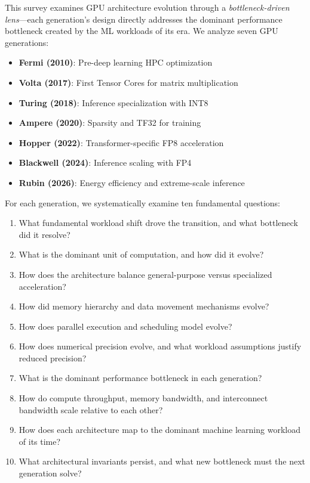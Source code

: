 \documentclass{article}
\begin{document}
This survey examines GPU architecture evolution through a \textit{bottleneck-driven lens}—each generation's design directly addresses the dominant performance bottleneck created by the ML workloads of its era. We analyze seven GPU generations:

\begin{itemize}
\item \textbf{Fermi (2010)}: Pre-deep learning HPC optimization
\item \textbf{Volta (2017)}: First Tensor Cores for matrix multiplication
\item \textbf{Turing (2018)}: Inference specialization with INT8
\item \textbf{Ampere (2020)}: Sparsity and TF32 for training
\item \textbf{Hopper (2022)}: Transformer-specific FP8 acceleration
\item \textbf{Blackwell (2024)}: Inference scaling with FP4
\item \textbf{Rubin (2026)}: Energy efficiency and extreme-scale inference
\end{itemize}

For each generation, we systematically examine ten fundamental questions:
\begin{enumerate}
\item What fundamental workload shift drove the transition, and what bottleneck did it resolve?
\item What is the dominant unit of computation, and how did it evolve?
\item How does the architecture balance general-purpose versus specialized acceleration?
\item How did memory hierarchy and data movement mechanisms evolve?
\item How does parallel execution and scheduling model evolve?
\item How does numerical precision evolve, and what workload assumptions justify reduced precision?
\item What is the dominant performance bottleneck in each generation?
\item How do compute throughput, memory bandwidth, and interconnect bandwidth scale relative to each other?
\item How does each architecture map to the dominant machine learning workload of its time?
\item What architectural invariants persist, and what new bottleneck must the next generation solve?
\end{enumerate}
\end{document}

